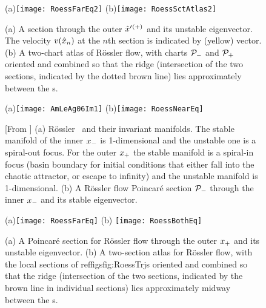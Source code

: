 \begin{figure}%
\begin{center}
(a)\texttt{[image: RoessFarEq2]}%
(b)\texttt{[image: RoessSctAtlas2]}
\end{center}
  \caption[R\"ossler section, outer {\eqv}]{
(a)
  A section through the outer {\eqv} ${\hat{x}'}{}^{(+)}$  and its unstable
  eigenvector. The velocity $v(\hat{x}_n)$ at the $n$th section is
  indicated by (yellow) vector.
(b)
  A two-chart atlas of R\"ossler flow, with charts ${\cal P}_{-}$ and
  ${\cal P}_{+}$ oriented and combined so that the ridge (intersection of
  the two sections, indicated by the dotted brown line) lies
  approximately between the \template s.
  } \label{fig:RoessFarEq2}
\end{figure}

\begin{figure}
(a)\texttt{[image: AmLeAg06Im1]}
(b)\texttt{[image: RoessNearEq]}
    \caption{[From ]
(a)
R\"ossler \eqva\ and their invariant manifolds. The stable manifold of
the inner {\eqv} $x_{-}$  is 1-dimensional and the unstable one is a
spiral-out focus. For the outer {\eqv} $x_{+}$  the stable manifold is
a spiral-in focus (basin boundary for initial conditions that either fall
into the chaotic attractor, or escape to infinity) and the unstable
manifold is 1-dimensional.
(b)
  A R\"ossler flow Poincar\'e section ${\cal P}_{-}$ through the inner
  {\eqv} $x_{-}$ and its stable eigenvector.
    }
\label{fig:AmLeAg06Im1}
\end{figure}

\begin{figure}%
\begin{center}
(a)\texttt{[image: RoessFarEq]}
(b) \texttt{[image: RoessBothEq]}
\end{center}
  \caption[R\"ossler section, outer {\eqv}]{
(a) A Poincar\'e section for R\"ossler flow through the outer {\eqv}
$x_{+}$  and its unstable eigenvector.
(b)
  A two-section atlas for R\"ossler flow, with the local sections of
  reffigs{fig:RoessTrjs} oriented and combined so that
  the ridge (intersection of the two sections, indicated by the brown
  line in individual sections) lies  approximately midway between the
  \template s.
  } \label{fig:RoessFarEq1}
\end{figure}

